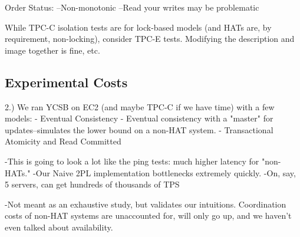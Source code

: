 Order Status:
--Non-monotonic
--Read your writes may be problematic

While TPC-C isolation tests are for lock-based models (and HATs are,
by requirement, non-locking), consider TPC-E tests. Modifying the
description and image together is fine, etc.


\subsection{Experimental Costs}


2.) We ran YCSB on EC2 (and maybe TPC-C if we have time) with a few models:
	- Eventual Consistency
	- Eventual consistency with a "master" for updates--simulates the lower bound on a non-HAT system.
	- Transactional Atomicity and Read Committed
	
	-This is going to look a lot like the ping tests: much higher latency for "non-HATs."
	-Our Naive 2PL implementation bottlenecks extremely quickly.
	-On, say, 5 servers, can get hundreds of thousands of TPS

	-Not meant as an exhaustive study, but validates our intuitions. Coordination costs of non-HAT systems are unaccounted for, will only go up, and we haven't even talked about availability.
